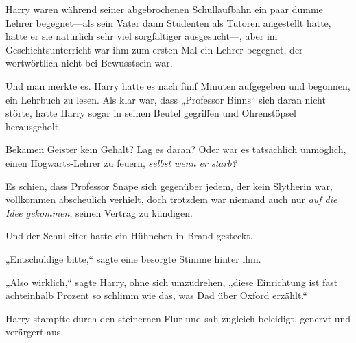 Harry waren während seiner abgebrochenen Schullaufbahn ein paar dumme Lehrer begegnet—als sein Vater dann Studenten als Tutoren angestellt hatte, hatte er sie natürlich sehr viel sorgfältiger ausgesucht—, aber im Geschichtsunterricht war ihm zum ersten Mal ein Lehrer begegnet, der wortwörtlich nicht bei Bewusstsein war.

Und man merkte es. Harry hatte es nach fünf Minuten aufgegeben und begonnen, ein Lehrbuch zu lesen. Als klar war, dass „Professor Binns“ sich daran nicht störte, hatte Harry sogar in seinen Beutel gegriffen und Ohrenstöpsel herausgeholt.

Bekamen Geister kein Gehalt? Lag es daran? Oder war es tatsächlich unmöglich, einen Hogwarts-Lehrer zu feuern, \emph{selbst wenn er starb?}

Es schien, dass Professor Snape sich gegenüber jedem, der kein Slytherin war, vollkommen abscheulich verhielt, doch trotzdem war niemand auch nur \emph{auf die Idee gekommen}, seinen Vertrag zu kündigen.

Und der Schulleiter hatte ein Hühnchen in Brand gesteckt.

„Entschuldige bitte,“ sagte eine besorgte Stimme hinter ihm.

„Also wirklich,“ sagte Harry, ohne sich umzudrehen, „diese Einrichtung ist fast achteinhalb Prozent so schlimm wie das, was Dad über Oxford erzählt.“

\later

Harry stampfte durch den steinernen Flur und sah zugleich beleidigt, genervt und verärgert aus.

